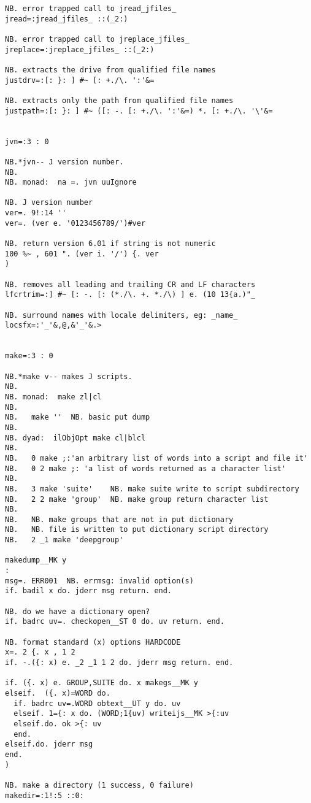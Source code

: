 \begin{lstlisting}[frame=single,framerule=0pt,basicstyle=\ttfamily\tiny]
NB. error trapped call to jread_jfiles_
jread=:jread_jfiles_ ::(_2:)

NB. error trapped call to jreplace_jfiles_
jreplace=:jreplace_jfiles_ ::(_2:)

NB. extracts the drive from qualified file names
justdrv=:[: }: ] #~ [: +./\. ':'&=

NB. extracts only the path from qualified file names
justpath=:[: }: ] #~ ([: -. [: +./\. ':'&=) *. [: +./\. '\'&=


jvn=:3 : 0

NB.*jvn-- J version number.
NB.
NB. monad:  na =. jvn uuIgnore

NB. J version number
ver=. 9!:14 ''
ver=. (ver e. '0123456789/')#ver

NB. return version 6.01 if string is not numeric
100 %~ , 601 ". (ver i. '/') {. ver
)

NB. removes all leading and trailing CR and LF characters
lfcrtrim=:] #~ [: -. [: (*./\. +. *./\) ] e. (10 13{a.)"_

NB. surround names with locale delimiters, eg: _name_
locsfx=:'_'&,@,&'_'&.>


make=:3 : 0

NB.*make v-- makes J scripts.
NB.
NB. monad:  make zl|cl
NB.
NB.   make ''  NB. basic put dump
NB.
NB. dyad:  ilObjOpt make cl|blcl
NB.
NB.   0 make ;:'an arbitrary list of words into a script and file it'
NB.   0 2 make ;: 'a list of words returned as a character list'
NB.
NB.   3 make 'suite'    NB. make suite write to script subdirectory
NB.   2 2 make 'group'  NB. make group return character list
NB.
NB.   NB. make groups that are not in put dictionary
NB.   NB. file is written to put dictionary script directory
NB.   2 _1 make 'deepgroup'

makedump__MK y
:
msg=. ERR001  NB. errmsg: invalid option(s)
if. badil x do. jderr msg return. end.

NB. do we have a dictionary open?
if. badrc uv=. checkopen__ST 0 do. uv return. end.

NB. format standard (x) options HARDCODE
x=. 2 {. x , 1 2
if. -.({: x) e. _2 _1 1 2 do. jderr msg return. end.

if. ({. x) e. GROUP,SUITE do. x makegs__MK y
elseif.  ({. x)=WORD do.
  if. badrc uv=.WORD obtext__UT y do. uv
  elseif. 1={: x do. (WORD;1{uv) writeijs__MK >{:uv
  elseif.do. ok >{: uv
  end.
elseif.do. jderr msg
end.
)

NB. make a directory (1 success, 0 failure)
makedir=:1!:5 ::0:



\end{lstlisting}
